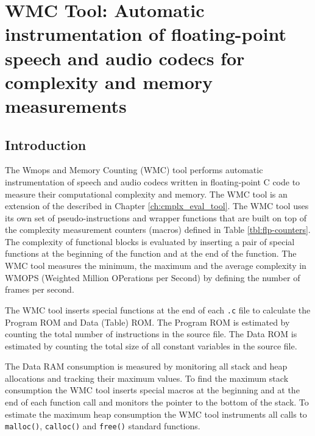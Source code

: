 %
\chapter{WMC Tool: Automatic instrumentation of floating-point speech
         and audio codecs for complexity and memory measurements}

\section{Introduction}

The Wmops and Memory Counting (WMC) tool performs automatic instrumentation of speech and audio codecs written in floating-point C code to measure their computational complexity and memory. The WMC tool is an extension of the  described in Chapter \ref{ch:cmplx_eval_tool}.
The WMC tool uses its own set of pseudo-instructions and wrapper functions that are built on top of the complexity measurement counters (macros) defined in Table \ref{tbl:flp-counters}. The complexity of functional blocks is evaluated by inserting a pair of special functions at the beginning of the function and at the end of the function. The WMC tool measures the minimum, the maximum and the average complexity in WMOPS (Weighted Million OPerations per Second) by defining the number of frames per second.

The WMC tool inserts special functions at the end of each \verb|.c| file to calculate the Program ROM and Data (Table) ROM. The Program ROM is estimated by counting the total number of instructions in the source file. The Data ROM is estimated by counting the total size of all constant variables in the source file.

The Data RAM consumption is measured by monitoring all stack and heap allocations and tracking their maximum values. To find the maximum stack consumption the WMC tool inserts special macros at the beginning and at the end of each function call and monitors the pointer to the bottom of the stack. To estimate the maximum heap consumption the WMC tool instruments all calls to \verb|malloc()|, \verb|calloc()| and \verb|free()| standard functions.

